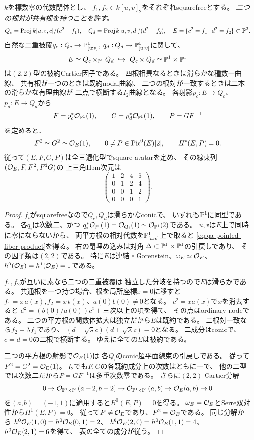 \begin{lemma}[全noncubic点曲線のファイバー積と二つのpencil]
\label{lem:qa-pointed-all-rootpair-geometry}
$k$を標数零の代数閉体とし、
$f_1,f_2\in k[u,v]_2$をそれぞれsquarefreeとする。
\emph{二つの根対が共有根を持つことを許す。}
\[
 Q_c=\operatorname{Proj}k[u,v,c]/(c^2-f_1),\quad
 Q_d=\operatorname{Proj}k[u,v,d]/(d^2-f_2),\quad
 E=\{c^2=f_1,\ d^2=f_2\}\subset\mathbb P^3 .
\]
自然な二重被覆$q_c:Q_c\to\mathbb P^1_{[u:v]}$,
$q_d:Q_d\to\mathbb P^1_{[u:v]}$に関して、
\begin{equation}
 E\simeq Q_c\times_{\mathbb P^1}Q_d
 \ \hookrightarrow\ Q_c\times Q_d\simeq\mathbb P^1\times\mathbb P^1
\label{eq:qa-pointed-fiber-product}
\end{equation}
は$(2,2)$型の被約Cartier因子である。
四根相異なるときは滑らかな種数一曲線、
共有根が一つのときは既約nodal曲線、
二つの根対が一致するときは二本の滑らかな有理曲線が
二点で横断する$I_2$曲線となる。
各射影$p_c:E\to Q_c$、$p_d:E\to Q_d$から
\[
 F=p_c^*\mathcal O_{\mathbb P^1}(1),\qquad
 G=p_d^*\mathcal O_{\mathbb P^1}(1),\qquad P=GF^{-1}
\]
を定めると、
\[
 F^2\simeq G^2\simeq\mathcal O_E(1),\qquad
 0\ne P\in\operatorname{Pic}^0(E)[2],\qquad H^*(E,P)=0 .
\]
従って$(E,F,G,P)$は全三退化型でsquare avatarを定め、
その線束列$(\mathcal O_E,F,F^2,F^2G)$の
上三角Hom次元は
\[
 \begin{pmatrix}
 1&2&4&6\\0&1&2&4\\0&0&1&2\\0&0&0&1
 \end{pmatrix}.
\]
\end{lemma}
\begin{proof}
$f_i$がsquarefreeなので$Q_c,Q_d$は滑らかなconicで、
いずれも$\mathbb P^1$に同型である。
各$q_i$は次数二、かつ
$q_i^*\mathcal O_{\mathbb P^1}(1)=\mathcal O_{Q_i}(1)
 \simeq\mathcal O_{\mathbb P^1}(2)$である。
$u,v$は$E$上で同時に零にならないから、
両平方根の相対代数を$\mathbb P^1_{[u:v]}$上で取ると
\eqref{eq:qa-pointed-fiber-product}を得る。
右の閉埋め込みは対角
$\Delta\subset\mathbb P^1\times\mathbb P^1$の引戻しであり、
その因子類は$(2,2)$である。
特に$E$は連結・Gorenstein、$\omega_E\simeq\mathcal O_E$、
$h^0(\mathcal O_E)=h^1(\mathcal O_E)=1$である。

$f_1,f_2$が互いに素なら二つの二重被覆は
独立した分岐を持つので$E$は滑らかである。
共通根を一つ持つ場合、根を局所座標$x=0$に移すと
$f_1=x\,a(x), f_2=x\,b(x)$、$a(0)b(0)\ne0$となる。
$c^2=xa(x)$で$x$を消去すると
$d^2=(b(0)/a(0))c^2+$三次以上の項を得て、
その点はordinary nodeである。
二つの平方根の関数体拡大は独立だから$E$は既約である。
二根対一致なら$f_2=\lambda f_1$であり、
$(d-\sqrt\lambda c)(d+\sqrt\lambda c)=0$となる。
二成分はconicで、$c=d=0$の二根で横断する。
ゆえに全ての$E$は被約である。

二つの平方根の射影で$\mathcal O_E(1)$は
各$Q_i$のconic超平面線束の引戻しである。
従って$F^2=G^2=\mathcal O_E(1)$。
$I_2$でも$F,G$の各既約成分上の次数はともに一で、
他の二型では次数二だから$P=GF^{-1}$は多重次数零である。
さらに$(2,2)$ Cartier分解
\[
 0\to\mathcal O_{\mathbb P^1\times\mathbb P^1}(a-2,b-2)
 \to\mathcal O_{\mathbb P^1\times\mathbb P^1}(a,b)
 \to\mathcal O_E(a,b)\to0
\]
を$(a,b)=(-1,1)$に適用すると$H^0(E,P)=0$を得る。
$\omega_E=\mathcal O_E$とSerre双対性から$H^1(E,P)=0$。
従って$P\ne\mathcal O_E$であり、$P^2=\mathcal O_E$である。
同じ分解から
$h^0\mathcal O_E(1,0)=h^0\mathcal O_E(0,1)=2$、
$h^0\mathcal O_E(2,0)=h^0\mathcal O_E(1,1)=4$、
$h^0\mathcal O_E(2,1)=6$を得て、
表の全ての成分が従う。
\end{proof}

